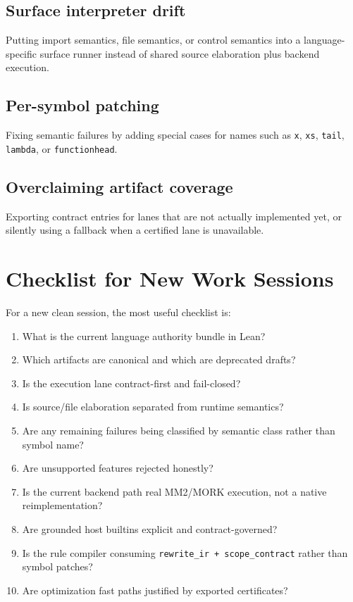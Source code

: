 \documentclass[11pt]{article}
\begin{document}
\subsection{Surface interpreter drift}
Putting import semantics, file semantics, or control semantics into a language-specific surface runner instead of shared source elaboration plus backend execution.

\subsection{Per-symbol patching}
Fixing semantic failures by adding special cases for names such as \texttt{x}, \texttt{xs}, \texttt{tail}, \texttt{lambda}, or \texttt{functionhead}.

\subsection{Overclaiming artifact coverage}
Exporting contract entries for lanes that are not actually implemented yet, or silently using a fallback when a certified lane is unavailable.

\section{Checklist for New Work Sessions}

For a new clean session, the most useful checklist is:

\begin{enumerate}
  \item What is the current language authority bundle in Lean?
  \item Which artifacts are canonical and which are deprecated drafts?
  \item Is the execution lane contract-first and fail-closed?
  \item Is source/file elaboration separated from runtime semantics?
  \item Are any remaining failures being classified by semantic class rather than symbol name?
  \item Are unsupported features rejected honestly?
  \item Is the current backend path real MM2/MORK execution, not a native reimplementation?
  \item Are grounded host builtins explicit and contract-governed?
  \item Is the rule compiler consuming \texttt{rewrite\_ir + scope\_contract} rather than symbol patches?
  \item Are optimization fast paths justified by exported certificates?
\end{enumerate}
\end{document}
